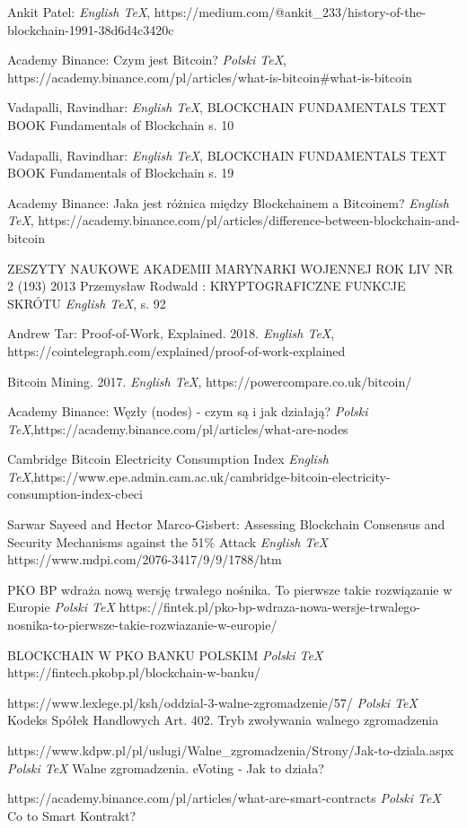 \documentclass[a4paper,12pt]{book}
\begin{document}
\begin{thebibliography}{99}
 Ankit Patel:
\emph{English \TeX},
https://medium.com/@ankit\_233/history-of-the-blockchain-1991-38d6d4c3420c

 Academy Binance: Czym jest Bitcoin?
\emph{Polski \TeX},
https://academy.binance.com/pl/articles/what-is-bitcoin\#what-is-bitcoin

 Vadapalli, Ravindhar:
\emph{English \TeX},
BLOCKCHAIN FUNDAMENTALS TEXT BOOK Fundamentals of Blockchain s. 10

 Vadapalli, Ravindhar:
\emph{English \TeX},
BLOCKCHAIN FUNDAMENTALS TEXT BOOK Fundamentals of Blockchain s. 19

 Academy Binance: Jaka jest różnica między Blockchainem a Bitcoinem?
\emph{English \TeX},
https://academy.binance.com/pl/articles/difference-between-blockchain-and-bitcoin

 ZESZYTY NAUKOWE AKADEMII MARYNARKI WOJENNEJ
ROK LIV NR 2 (193) 2013  Przemysław Rodwald : KRYPTOGRAFICZNE FUNKCJE SKRÓTU
\emph{English \TeX},
 s. 92

 Andrew Tar: Proof-of-Work, Explained. 2018.
\emph{English \TeX},  https://cointelegraph.com/explained/proof-of-work-explained

 Bitcoin Mining. 2017. 
\emph{English \TeX}, https://powercompare.co.uk/bitcoin/

 Academy Binance: Węzły (nodes) - czym są i jak działają?
\emph{Polski \TeX},https://academy.binance.com/pl/articles/what-are-nodes

 Cambridge Bitcoin Electricity Consumption Index
\emph{English \TeX},https://www.epe.admin.cam.ac.uk/cambridge-bitcoin-electricity-consumption-index-cbeci

 Sarwar Sayeed and Hector Marco-Gisbert: Assessing Blockchain Consensus and Security Mechanisms against the 51\% Attack
\emph{English \TeX} https://www.mdpi.com/2076-3417/9/9/1788/htm

 PKO BP wdraża nową wersję trwałego nośnika. To pierwsze takie rozwiązanie w Europie
\emph{Polski \TeX} https://fintek.pl/pko-bp-wdraza-nowa-wersje-trwalego-nosnika-to-pierwsze-takie-rozwiazanie-w-europie/

BLOCKCHAIN W PKO BANKU POLSKIM
\emph{Polski \TeX} https://fintech.pkobp.pl/blockchain-w-banku/

https://www.lexlege.pl/ksh/oddzial-3-walne-zgromadzenie/57/
\emph{Polski \TeX} Kodeks Spółek Handlowych Art. 402. Tryb zwoływania walnego zgromadzenia

 https://www.kdpw.pl/pl/uslugi/Walne\_zgromadzenia/Strony/Jak-to-dziala.aspx
\emph{Polski \TeX} Walne zgromadzenia. eVoting - Jak to działa?

 https://academy.binance.com/pl/articles/what-are-smart-contracts
\emph{Polski \TeX} Co to Smart Kontrakt?


\end{thebibliography}
\end{document}
